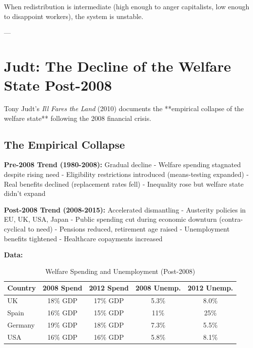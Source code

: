 When redistribution is intermediate (high enough to anger capitalists, low enough to disappoint workers), the system is unstable.

---

\clearpage


\section{Judt: The Decline of the Welfare State Post-2008}
\label{sec:judt}

Tony Judt's \emph{Ill Fares the Land} (2010) documents the **empirical collapse of the welfare state** following the 2008 financial crisis.

\subsection{The Empirical Collapse}

\textbf{Pre-2008 Trend (1980-2008):} Gradual decline
- Welfare spending stagnated despite rising need
- Eligibility restrictions introduced (means-testing expanded)
- Real benefits declined (replacement rates fell)
- Inequality rose but welfare state didn't expand

\textbf{Post-2008 Trend (2008-2015):} Accelerated dismantling
- Austerity policies in EU, UK, USA, Japan
- Public spending cut during economic downturn (contra-cyclical to need)
- Pensions reduced, retirement age raised
- Unemployment benefits tightened
- Healthcare copayments increased

\textbf{Data:}

\begin{table}[h]
\centering
\caption{Welfare Spending and Unemployment (Post-2008)}
\label{tab:austerity}
\begin{tabular}{lcccc}
\toprule
\textbf{Country} & \textbf{2008 Spend} & \textbf{2012 Spend} & \textbf{2008 Unemp.} & \textbf{2012 Unemp.} \\
\midrule
UK & 18\% GDP & 17\% GDP & 5.3\% & 8.0\% \\
Spain & 16\% GDP & 15\% GDP & 11\% & 25\% \\
Germany & 19\% GDP & 18\% GDP & 7.3\% & 5.5\% \\
USA & 16\% GDP & 16\% GDP & 5.8\% & 8.1\% \\
\bottomrule
\end{tabular}
\end{table}

